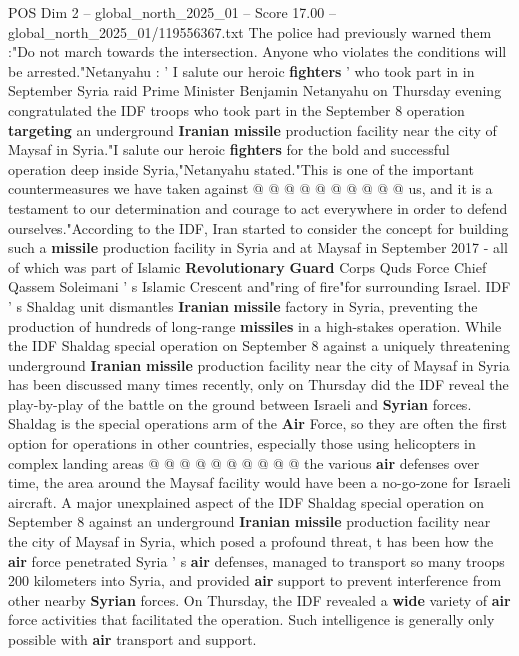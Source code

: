 \begin{textsample}{POS Dim 2 – global\_north\_2025\_01 – Score 17.00 – global\_north\_2025\_01/119556367.txt}
The police had previously warned them :"Do not march towards the intersection.
Anyone who violates the conditions will be arrested."Netanyahu : ' I salute our heroic \textbf{fighters} ' who took part in in September Syria raid Prime Minister Benjamin Netanyahu on Thursday evening congratulated the IDF troops who took part in the September 8 operation \textbf{targeting} an underground \textbf{Iranian} \textbf{missile} production facility near the city of Maysaf in Syria."I salute our heroic \textbf{fighters} for the bold and successful operation deep inside Syria,"Netanyahu stated."This is one of the important countermeasures we have taken against @ @ @ @ @ @ @ @ @ @ us, and it is a testament to our determination and courage to act everywhere in order to defend ourselves."According to the IDF, Iran started to consider the concept for building such a \textbf{missile} production facility in Syria and at Maysaf in September 2017 - all of which was part of Islamic \textbf{Revolutionary} \textbf{Guard} Corps Quds Force Chief Qassem Soleimani ' s Islamic Crescent and"ring of fire"for surrounding Israel.
IDF ' s Shaldag unit dismantles \textbf{Iranian} \textbf{missile} factory in Syria, preventing the production of hundreds of long-range \textbf{missiles} in a high-stakes operation.
While the IDF Shaldag special operation on September 8 against a uniquely threatening underground \textbf{Iranian} \textbf{missile} production facility near the city of Maysaf in Syria has been discussed many times recently, only on Thursday did the IDF reveal the play-by-play of the battle on the ground between Israeli and \textbf{Syrian} forces.
Shaldag is the special operations arm of the \textbf{Air} Force, so they are often the first option for operations in other countries, especially those using helicopters in complex landing areas @ @ @ @ @ @ @ @ @ @ the various \textbf{air} defenses over time, the area around the Maysaf facility would have been a no-go-zone for Israeli aircraft.
A major unexplained aspect of the IDF Shaldag special operation on September 8 against an underground \textbf{Iranian} \textbf{missile} production facility near the city of Maysaf in Syria, which posed a profound threat, t has been how the \textbf{air} force penetrated Syria ' s \textbf{air} defenses, managed to transport so many troops 200 kilometers into Syria, and provided \textbf{air} support to prevent interference from other nearby \textbf{Syrian} forces.
On Thursday, the IDF revealed a \textbf{wide} variety of \textbf{air} force activities that facilitated the operation.
Such intelligence is generally only possible with \textbf{air} transport and support.

\end{textsample}
